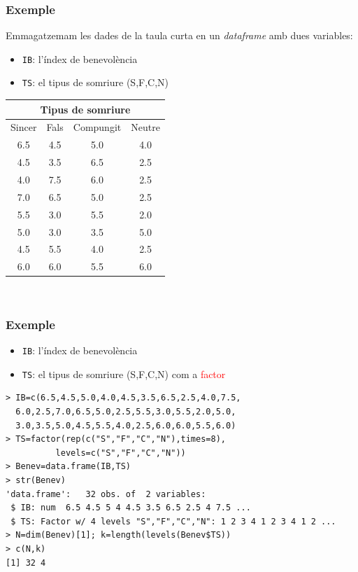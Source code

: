 \documentclass[12pt,t]{beamer}
\newcommand{\red}[1]{\textcolor{red}{#1}}
\theoremstyle{plain}
\theoremstyle{definition}
\begin{document}
\begin{frame}
\frametitle{Exemple}


Emmagatzemam les dades de la taula curta en  un \textsl{dataframe} amb dues variables:
\begin{itemize}
\item \texttt{IB}: l'índex de benevolència
\item \texttt{TS}: el tipus de somriure (S,F,C,N)
\end{itemize}

{\begin{center}
\footnotesize \begin{tabular}{cccc}
\multicolumn{4}{c}{Tipus de somriure}\\\hline
Sincer & Fals & Compungit & Neutre\\\hline
6.5 &4.5 &  5.0  &  4.0 \\
4.5 &3.5 & 6.5  &  2.5  \\
4.0 &7.5 & 6.0  &  2.5  \\
7.0  &6.5 & 5.0  &  2.5  \\
5.5 & 3.0 & 5.5  & 2.0  \\
5.0  &3.0 & 3.5  &  5.0  \\
4.5  &5.5 & 4.0  & 2.5  \\
6.0 & 6.0 &5.5  &6.0   
\end{tabular}
\end{center}
}\
\end{frame}


\begin{frame}[fragile]
\frametitle{Exemple}\vspace*{-1ex}

\begin{itemize}
\item \texttt{IB}: l'índex de benevolència
\item \texttt{TS}: el tipus de somriure (S,F,C,N) com a \red{factor}
\end{itemize}

\begin{lstlisting}
> IB=c(6.5,4.5,5.0,4.0,4.5,3.5,6.5,2.5,4.0,7.5,
  6.0,2.5,7.0,6.5,5.0,2.5,5.5,3.0,5.5,2.0,5.0,
  3.0,3.5,5.0,4.5,5.5,4.0,2.5,6.0,6.0,5.5,6.0)
> TS=factor(rep(c("S","F","C","N"),times=8),
          levels=c("S","F","C","N"))
> Benev=data.frame(IB,TS)
> str(Benev)
'data.frame':	32 obs. of  2 variables:
 $ IB: num  6.5 4.5 5 4 4.5 3.5 6.5 2.5 4 7.5 ...
 $ TS: Factor w/ 4 levels "S","F","C","N": 1 2 3 4 1 2 3 4 1 2 ...
> N=dim(Benev)[1]; k=length(levels(Benev$TS))
> c(N,k)
[1] 32 4
\end{lstlisting}
\end{frame}
\end{document}

